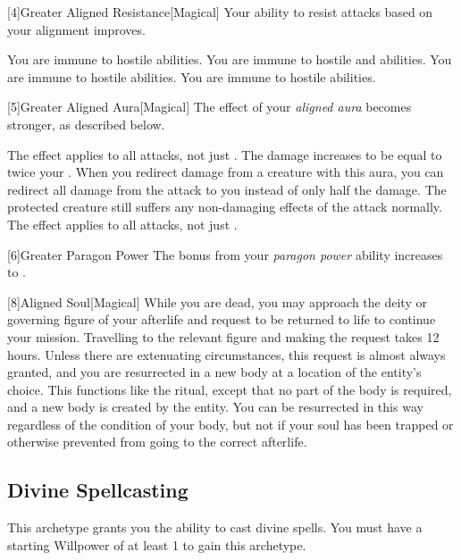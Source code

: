         [4]{Greater Aligned Resistance}[Magical]
        Your ability to resist attacks based on your alignment improves.

         You are immune to hostile  abilities.
         You are immune to hostile  and  abilities.
         You are immune to hostile  abilities.
         You are immune to hostile  abilities.

        [5]{Greater Aligned Aura}[Magical]
        The effect of your \textit{aligned aura} becomes stronger, as described below.

         The effect applies to all attacks, not just .
         The damage increases to be equal to twice your .
         When you redirect damage from a creature with this aura, you can redirect all damage from the attack to you instead of only half the damage.
        The protected creature still suffers any non-damaging effects of the attack normally.
         The effect applies to all attacks, not just .

        [6]{Greater Paragon Power} The bonus from your \textit{paragon power} ability increases to .

        [8]{Aligned Soul}[Magical]
        While you are dead, you may approach the deity or governing figure of your afterlife and request to be returned to life to continue your mission.
        Travelling to the relevant figure and making the request takes 12 hours.
        Unless there are extenuating circumstances, this request is almost always granted, and you are resurrected in a new body at a location of the entity's choice.
        This functions like the  ritual, except that no part of the body is required, and a new body is created by the entity.
        You can be resurrected in this way regardless of the condition of your body, but not if your soul has been trapped or otherwise prevented from going to the correct afterlife.

    \subsection{Divine Spellcasting}
        This archetype grants you the ability to cast divine spells.
        You must have a starting Willpower of at least 1 to gain this archetype.

